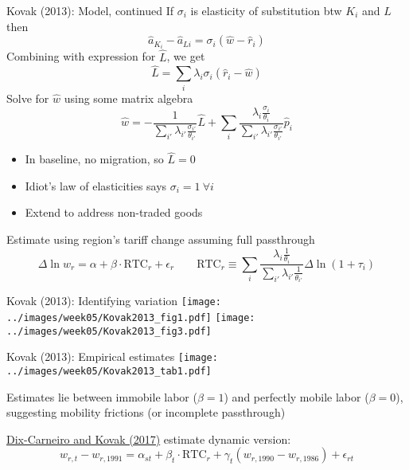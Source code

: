 \documentclass[11pt,notes=hide,aspectratio=169]{beamer}
\begin{document}
\begin{frame}{Kovak (2013): Model, continued}
If $\sigma_i$ is elasticity of substitution btw $K_i$ and $L$ then
\begin{equation*}
\hat{a}_{K_i} - \hat{a}_{Li} = \sigma_i \left(\hat{w} - \hat{r}_i\right)
\end{equation*}
Combining with expression for $\hat{L}$, we get
\begin{equation*}
\hat{L} = \sum_i \lambda_i \sigma_i \left( \hat{r}_i - \hat{w}\right)
\end{equation*}
Solve for $\hat{w}$ using some matrix algebra
\begin{equation*}
\hat{w}
=
- \frac{1}{\sum_{i'} \lambda_{i'} \frac{\sigma_{i'}}{\theta_{i'}}} \hat{L}
+ \sum_i \frac{\lambda_{i} \frac{\sigma_{i}}{\theta_{i}}}{\sum_{i'} \lambda_{i'} \frac{\sigma_{i'}}{\theta_{i'}}} \hat{p}_i
\end{equation*}
\vspace{-3mm}
\begin{itemize}
	\item In baseline, no migration, so $\hat{L}=0$
	\item Idiot's law of elasticities says $\sigma_i =1 \ \forall i$
	\item Extend to address non-traded goods
\end{itemize}
Estimate using region's tariff change assuming full passthrough
\begin{equation*}
\Delta \ln w_{r} = \alpha + \beta \cdot \text{RTC}_r + \epsilon_r
\qquad
\text{RTC}_r\equiv \sum_i \frac{\lambda_{i} \frac{1}{\theta_{i}}}{\sum_{i'} \lambda_{i'} \frac{1}{\theta_{i'}}} \Delta \ln \left(1 + \tau_i\right)
\end{equation*}
\end{frame}
\begin{frame}{Kovak (2013): Identifying variation}
\texttt{[image: ../images/week05/Kovak2013\_fig1.pdf]}
\texttt{[image: ../images/week05/Kovak2013\_fig3.pdf]}
\end{frame}
\begin{frame}{Kovak (2013): Empirical estimates}
\texttt{[image: ../images/week05/Kovak2013\_tab1.pdf]}
{\small Estimates lie between immobile labor ($\beta = 1$) and perfectly mobile labor ($\beta = 0$),
suggesting mobility frictions (or incomplete passthrough)\par}
{\small \href{https://www.aeaweb.org/articles?id=10.1257/aer.20161214}{Dix-Carneiro and Kovak (2017)} estimate dynamic version:}
\begin{equation*}
w_{r,t} - w_{r,\text{1991}} = \alpha_{st} + \beta_t \cdot \text{RTC}_r + \gamma_t (w_{r,\text{1990}} - w_{r,\text{1986}}) +  \epsilon_{rt}
\end{equation*}
\end{frame}
\end{document}
